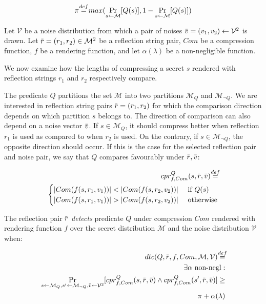\documentclass[conference, letterpaper, 10pt]{IEEEtran}
\newcommand\defeq{\stackrel{\mathclap{\normalfont\mbox{def}}}{=}}
\newcommand{\overbar}[1]{\mkern 1.5mu\overline{\mkern-1.5mu#1\mkern-1.5mu}\mkern 1.5mu}
\begin{document}
\begin{equation*}
    \pi \defeq max(\Pr_{s \leftarrow \mathcal{M}}[Q(s)], 1 - \Pr_{s \leftarrow \mathcal{M}}[Q(s)])
\end{equation*}

Let $\mathcal{V}$ be a noise distribution from which a pair of noises
$\overbar{v} = (v_1, v_2) \leftarrow \mathcal{V}^2$ is drawn.  Let $\overbar{r}
= (r_1, r_2) \in \mathcal{M}^2$ be a reflection string pair, $Com$ be a
compression function, $f$ be a rendering function, and let $\alpha(\lambda)$ be
a non-negligible function.

We now examine how the lengths of compressing a secret $s$ rendered with
reflection strings $r_1$ and $r_2$ respectively compare.

The predicate $Q$ partitions the set $\mathcal{M}$ into two partitions
$\mathcal{M}_Q$ and $\mathcal{M}_{\lnot Q}$. We are interested in reflection
string pairs $\overbar{r} = (r_1, r_2)$ for which the comparison direction
depends on which partition $s$ belongs to.  The direction of comparison can
also depend on a noise vector $\overbar{v}$.  If $s \in \mathcal{M}_Q$, it
should compress better when reflection $r_1$ is used as compared to when $r_2$
is used. On the contrary, if $s \in \mathcal{M}_{\lnot Q}$, the opposite
direction should occur.  If this is the case for the selected reflection pair
and noise pair, we say that $Q$ compares favourably under $\overbar{r},
\overbar{v}$:

\begin{equation*}
\begin{split}
    cpr^Q_{f, Com}(s, \overbar{r}, \overbar{v})
    \defeq\\
    \begin{cases}
        |Com(f(s, r_1, v_1))| < |Com(f(s, r_2, v_2))| &\text{ if } Q(s)\\
        |Com(f(s, r_1, v_1))| > |Com(f(s, r_2, v_2))| &\text{ otherwise}
    \end{cases}
\end{split}
\end{equation*}

The reflection pair $\overbar{r}$ \textit{detects} predicate $Q$ under
compression $Com$ rendered with rendering function $f$ over the secret
distribution $\mathcal{M}$ and the noise distribution $\mathcal{V}$ when:

\begin{align*}
    dtc(Q, \overbar{r}, f, Com, \mathcal{M}, \mathcal{V})
    \defeq\\
    \exists \alpha \text{ non-negl}:\\
    \Pr_{s \leftarrow \mathcal{M}_Q,
        s' \leftarrow \mathcal{M}_{\lnot Q},
        \overbar{v} \leftarrow \mathcal{V}^2}
        [cpr^Q_{f, Com}(s, \overbar{r}, \overbar{v}) \land
         cpr^Q_{f, Com}(s', \overbar{r}, \overbar{v})]
    \geq\\
    \pi + \alpha(\lambda)
\end{align*}
\end{document}

